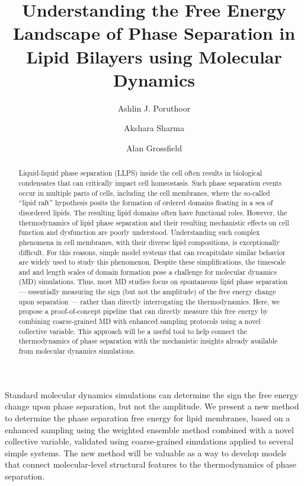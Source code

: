 \documentclass{biophys-new}
\title{Understanding the Free Energy Landscape of Phase Separation in Lipid Bilayers using Molecular Dynamics}
\author[1]{Ashlin J. Poruthoor}
\author[1]{Akshara Sharma}
\author[1,*]{Alan Grossfield}
\affil[1]{Department of Biochemistry and Biophysics, University of Rochester Medical Center, Rochester, NY 14642}
\begin{document}
\begin{frontmatter}
\begin{abstract}

Liquid-liquid phase separation (LLPS) inside the cell often results in biological condensates that can critically impact
cell homeostasis. Such phase separation events occur in multiple parts of cells, including
the cell membranes, where the so-called ``lipid raft'' hypothesis posits the formation of ordered domains floating in a sea
of disordered lipids. The resulting lipid domains often have functional roles.
However, the thermodynamics of lipid phase separation and their resulting
mechanistic effects on cell function and dysfunction are poorly understood. Understanding such complex phenomena in cell
membranes, with their diverse lipid compositions, is exceptionally difficult. For this reasons, simple model systems that can recapitulate similar behavior are
widely used to study this phenomenon. Despite these simplifications, the timescale and and length scales of domain formation
pose a challenge for molecular dynamics (MD) simulations.
Thus, most MD studies focus on spontaneous lipid phase separation --- essentially measuring the sign (but not the amplitude) of the free energy change upon separation --- rather than directly interrogating the thermodynamics.  Here, we propose a proof-of-concept pipeline that can 
directly measure this free energy by combining coarse-grained MD with enhanced sampling protocols using a novel collective variable. This approach will be a useful tool to help connect the thermodynamics of phase separation with the mechanistic insights already available from molecular dynamics simulations.

\end{abstract}

\begin{sigstatement}
    
Standard molecular dynamics simulations can determine the sign the free energy change upon phase separation, but not the amplitude. We present a new method to determine the phase separation free energy for lipid membranes, based on a enhanced sampling using the weighted ensemble method combined with a novel collective variable, validated using coarse-grained simulations applied to several simple systems. The new method will be valuable as a way to develop models that connect molecular-level structural features to the thermodynamics of phase separation.
    
\end{sigstatement}

\end{frontmatter}
\end{document}

